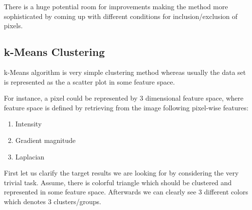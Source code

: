 There is a huge potential room for improvements making the method more sophisticated by coming up with different conditions for inclusion/exclusion of pixels.

\subsection{k-Means Clustering}
k-Means algorithm is very simple clustering method whereas usually the data set is represented as the a scatter plot in some feature space.

For instance, a pixel could be represented by 3 dimensional feature space, where feature space is defined by retrieving from the image following pixel-wise features:
\begin{enumerate}
    \setlength\itemsep{0.05em}
    \item Intensity
    \item Gradient magnitude
    \item Laplacian
\end{enumerate}

First let us clarify the target results we are looking for by considering the very trivial task.
Assume, there is colorful triangle which should be clustered and represented in some feature space. Afterwards we can clearly see 3 different colors which denotes 3 clusters/groups.

